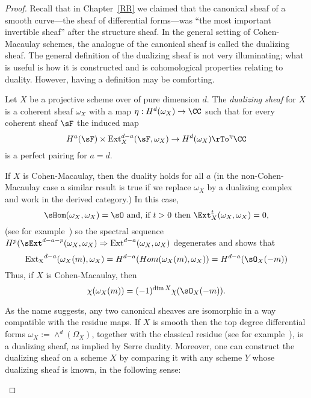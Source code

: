 \begin{proof}
Recall that in Chapter~\ref{RR} we claimed that the canonical sheaf of a smooth curve---the sheaf of differential forms---was ``the most important invertible sheaf'' after the structure sheaf. In the general setting of Cohen-Macaulay schemes, the analogue of the canonical sheaf is called the dualizing sheaf.
The general definition of the dualizing sheaf is not very illuminating; what is useful is how it is constructed and is cohomological properties relating to duality.
However, having a definition may be comforting. 

\begin{definition}
Let $X$ be a projective scheme over of pure dimension $d$. The \emph{dualizing sheaf} for $X$ is a coherent sheaf $\omega_X$ 
with a map $\eta: H^d(\omega_X) \to \CC$ such that for every coherent sheaf  $\sF$ the induced map
$$
H^a(\sF) \times { \rm Ext}_X^{d-a}(\sF, \omega_X) \to H^d(\omega_X) \rTo^\eta \CC
$$
is a perfect pairing for $a=d$. 
\end{definition}


\begin{fact}
If $X$ is Cohen-Macaulay, then the duality holds for all $a$ (in the non-Cohen-Macaulay case a similar result is true if we replace $\omega_X$ by a dualizing complex
and work in the derived category.) In this case, 
$$
\sHom(\omega_X, \omega_X) = \sO \hbox{ and, if $t>0$ then } \Ext_X^{t}(\omega_X, \omega_X) = 0,
$$
(see for example~\cite[Theorem[Theorems 3.3.4 and 3.3.10d]{BrunsHerzog}) so the spectral sequence $H^p(\sExt^{d-a-p}(\omega_X, \omega_X) \Rightarrow {\rm Ext}^{d-a}(\omega_X, \omega_X)$ degenerates and shows that 
$$
{\rm Ext_X}^{d-a}(\omega_X(m), \omega_X) = H^{d-a}(Hom(\omega_X(m), \omega_X)) = H^{d-a}(\sO_X(-m))
$$
Thus, if $X$ is Cohen-Macaulay, then 
$$
\chi(\omega_X(m)) =(-1)^{\dim X}\chi(\sO_X(-m)).
$$

As the name suggests, any two canonical sheaves are isomorphic in a way compatible with the
residue maps. If $X$ is smooth then the top degree differential forms $\omega_X :=\wedge^d(\Omega_X)$,
together with the classical residue (see for example~\cite[p. 648, 708]{Griffiths-Harris1978}), is a dualizing sheaf, as implied by Serre duality. Moreover, one can construct the dualizing sheaf on a scheme
$X$ by comparing it with any scheme $Y$ whose dualizing sheaf is known, in the following sense:


\end{fact}
\end{proof}
